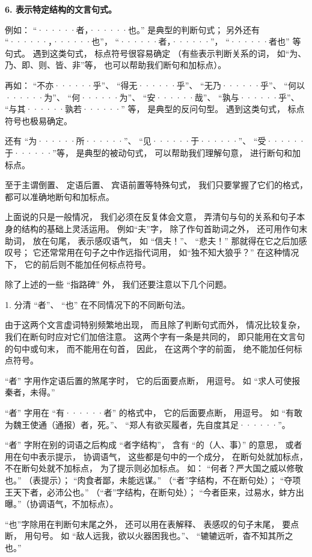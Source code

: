 \textbf{6. 表示特定结构的文言句式。}

例如：
“······者，······也。”
是典型的判断句式；
另外还有
“······，······也”，
“······者，······”，
“······者也”
等句式。
遇到这类句式，
标点符号很容易确定
（有些表示判断关系的词，
如“为、乃、即、则、皆、非”等，
也可以帮助我们断句和加标点）。

再如：
“不亦······乎”、
“得无······乎”、
“无乃······乎”、
“何以······为”、
“何······为”、
“安······哉”、
“孰与······乎”、
“与其······孰若······”
等，
是典型的反问句型。
遇到这类句式，
标点符号也极易确定。

还有
“为······所······”、
“见······于······”、
“受······于······”等，
是典型的被动句式，
可以帮助我们理解句意，
进行断句和加标点。

至于主谓倒置、
定语后置、
宾语前置等特殊句式，
我们只要掌握了它们的格式，
都可以准确地断句和加标点。

上面说的只是一般情况，
我们必须在反复体会文意，
弄清句与句的关系和句子本身的结构的基础上灵活运用。
例如“夫”字，
除了作句首助词之外，
还可用作句末助词，
放在句尾，
表示感叹语气，
如
“信夫！”、
“悲夫！”
那就得在它之后加感叹号；
它还常常用在句子之中作远指代词用，
如“独不知大狼乎？”
在这种情况下，
它的前后则不能加任何标点符号。

除了上述的一些
“指路碑”
外，
我们还要注意以下几个问题。

1. 分清
“者”、
“也”
在不同情况下的不同断句法。

由于这两个文言虚词特别频繁地出现，
而且除了判断句式而外，
情况比较复杂，
我们在断句时应对它们加倍注意。
这两个字有一条是共同的，
即只能用在文言句的句中或句末，
而不能用在句首，
因此，
在这两个字的前面，
绝不能加任何标点符号。

“者”
字用作定语后置的煞尾字时，
它的后面要点断，
用逗号。
如
“求人可使报秦者，未得。”

“者”
字用在
“有······者”
的格式中，
它的后面要点断，
用逗号。
如
“有敢为魏王使通（通报）者，死。”、
“郑人有欲买履者，先自度其足······”。

“者”
字附在别的词语之后构成
“者字结构”，
含有
“的（人、事）”
的意思，
或者用在句中表示提示，
协调语气，
这些都是句中的一个成分，
在断句处就加标点，
不在断句处就不加标点，
为了提示则必加标点。
如：
“何者？严大国之威以修敬也。”
（表提示）；
“肉食者鄙，未能远谋。”
（“者”字结构，不在断句处）；
“夺项王天下者，必沛公也。”
（“者”字结构，在断句处）；
“今者臣来，过易水，蚌方出曝。”（协调语气，不加标点）。

“也”字除用在判断句末尾之外，
还可以用在表解释、
表感叹的句子末尾，
要点断，
用句号。
如
“敌人远我，欲以火器困我也。”、
“辘辘远听，杳不知其所之也。”

